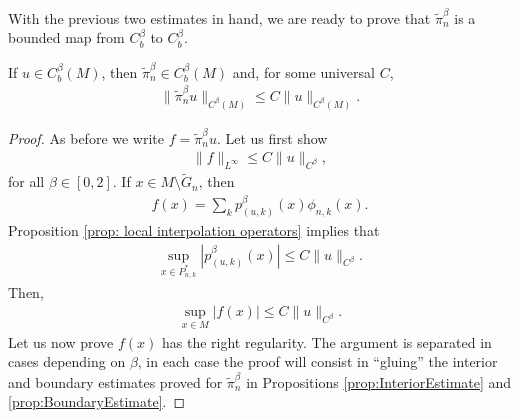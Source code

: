 \documentclass[11pt,reqno]{amsart}
\numberwithin{equation}{section}
\theoremstyle{plain}
\begin{document}
With the previous two estimates in hand, we are ready to prove that $\tilde \pi_n^\beta$ is a bounded map from $C^\beta_b$ to $C^\beta_b$.
\begin{thm}\label{thm:EnTnContOperatorInCbetaNorm}
  If $u\in C^\beta_b(M)$, then $\tilde \pi_n^\beta \in C^\beta_b(M)$ and, for some universal $C$,
  \begin{align*}
    \|\tilde \pi_n^\beta u\|_{C^\beta(M)}\leq C\|u\|_{C^\beta(M)}.		
  \end{align*}		
\end{thm}

\begin{proof}
  As before we write $f=\tilde \pi_n^\beta u$.  Let us first show
  \begin{align*}	
    \|f\|_{L^\infty} \leq C\|u\|_{C^\beta},	
  \end{align*}
  for all $\beta \in [0,2]$. If $x \in M\setminus \tilde G_n$, then
  \begin{align*}
    f(x) = \sum \limits_{k} p^\beta_{(u,k)}(x)\phi_{n,k}(x).
  \end{align*}
  Proposition \ref{prop: local interpolation operators} implies that
  \begin{align*}
    \sup \limits_{x\in P_{n,k}^*}|p^\beta_{(u,k)}(x)| \leq C\|u\|_{C^\beta}.
  \end{align*}
  Then,
  \begin{align*}
    \sup \limits_{x\in M}|f(x)|\leq C\|u\|_{C^\beta}.
  \end{align*}
  Let us now prove $f(x)$ has the right regularity. The argument is separated in cases depending on $\beta$, in each case the proof will consist in ``gluing'' the interior and boundary estimates proved for $\tilde \pi_n^\beta$ in Propositions \ref{prop:InteriorEstimate} and \ref{prop:BoundaryEstimate}.
  

\end{proof}
\end{document}
